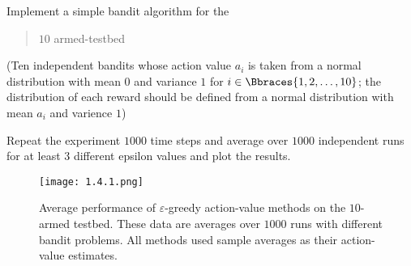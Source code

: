 
\begin{exercise}

Implement a simple bandit algorithm for the \blockquote{$10$ armed-testbed}.
(Ten independent bandits whose action value $a_i$ is taken from a normal distribution with mean $0$ and variance $1$ for $i \in \Bbraces{1, 2, \dots, 10}$; the distribution of each reward should be defined from a normal distribution with mean $a_i$ and varience $1$)

Repeat the experiment $1000$ time steps and average over $1000$ independent runs for at least $3$ different epsilon values and plot the results.

\end{exercise}


\begin{solution}

\phantom{}

\begin{figure}[H]
    \centering
    \texttt{[image: 1.4.1.png]}
    \caption
    {
        Average performance of $\varepsilon$-greedy action-value methods on the $10$-armed testbed.
        These data are averages over $1000$ runs with different bandit problems.
        All methods used sample averages as their action-value estimates.
    }
    \label{fig:1.4}
\end{figure}

\end{solution}

